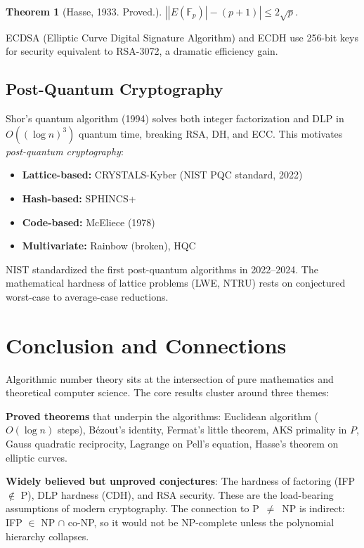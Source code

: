 \documentclass[12pt,a4paper]{amsart}
\newtheorem{theorem}{Theorem}[section]
\theoremstyle{definition}
\begin{document}
\begin{theorem}[Hasse, 1933. Proved.]
$|{|E(\mathbb{F}_p)| - (p+1)}| \le 2\sqrt{p}$.
\end{theorem}

ECDSA (Elliptic Curve Digital Signature Algorithm) and ECDH use 256-bit keys
for security equivalent to RSA-3072, a dramatic efficiency gain.

\subsection{Post-Quantum Cryptography}

Shor's quantum algorithm (1994) solves both integer factorization and DLP in
$O((\log n)^3)$ quantum time, breaking RSA, DH, and ECC. This motivates
\emph{post-quantum cryptography}:

\begin{itemize}
  \item \textbf{Lattice-based:} CRYSTALS-Kyber (NIST PQC standard, 2022)
  \item \textbf{Hash-based:} SPHINCS+
  \item \textbf{Code-based:} McEliece (1978)
  \item \textbf{Multivariate:} Rainbow (broken), HQC
\end{itemize}

NIST standardized the first post-quantum algorithms in 2022--2024. The
mathematical hardness of lattice problems (LWE, NTRU) rests on conjectured
worst-case to average-case reductions.

\section{Conclusion and Connections}

Algorithmic number theory sits at the intersection of pure mathematics and
theoretical computer science. The core results cluster around three themes:

\medskip
\noindent\textbf{Proved theorems} that underpin the algorithms:
Euclidean algorithm ($O(\log n)$ steps), Bézout's identity, Fermat's little
theorem, AKS primality in $P$, Gauss quadratic reciprocity, Lagrange on Pell's
equation, Hasse's theorem on elliptic curves.

\medskip
\noindent\textbf{Widely believed but unproved conjectures}:
The hardness of factoring (IFP $\notin$ P), DLP hardness (CDH), and
RSA security. These are the load-bearing assumptions of modern cryptography.
The connection to P~$\ne$~NP is indirect: IFP $\in$ NP $\cap$ co-NP, so
it would not be NP-complete unless the polynomial hierarchy collapses.
\end{document}
